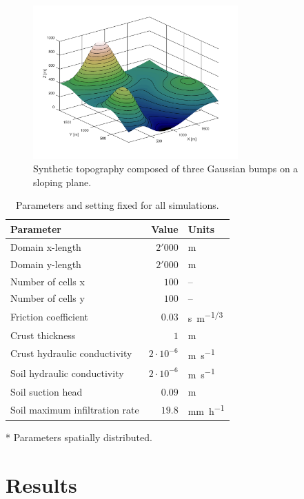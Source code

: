 \begin{figure}[htpb]
  \centering
  \includegraphics[width=0.7\textwidth]{../../../img/topography.png}
  \caption{Synthetic topography composed of three Gaussian bumps on a sloping plane.}
  \label{fig:topography}
\end{figure}

\begin{table}[htpb]
  \centering
  \caption{Parameters and setting fixed for all simulations.}
  \label{tab:simulations_parameters}
  \begin{threeparttable}
    \begin{tabular}{lrl}
      \toprule
      \textbf{Parameter} & \textbf{Value} & \textbf{Units} \\
      \midrule
      Domain x-length                          &    $2'000$           & \si{\meter}   \\
      Domain y-length                          &    $2'000$           & \si{\meter}   \\
      Number of cells x                        &    $100$             & --   \\
      Number of cells y                        &    $100$             & --   \\
      Friction coefficient\tnote{*}            &    $0.03$            & \si{s.m^{-1/3}}\\
      Crust thickness\tnote{*}                 &    $1$               & \si{\meter}\\
      Crust hydraulic conductivity\tnote{*}    &    $2\cdot 10^{-6}$  & \si{\meter\per\second}\\
      Soil hydraulic conductivity\tnote{*}     &    $2\cdot 10^{-6}$  & \si{\meter\per\second}\\
      Soil suction head\tnote{*}               &    $0.09$      & \si{\meter}\\
      Soil maximum infiltration rate\tnote{*}  &    $19.8$      & \si{\milli\meter\per\hour}\\
      \bottomrule
    \end{tabular}
    \begin{tablenotes}
      \item[*] Parameters spatially distributed.
    \end{tablenotes}
  \end{threeparttable}
\end{table}



\section{Results}

